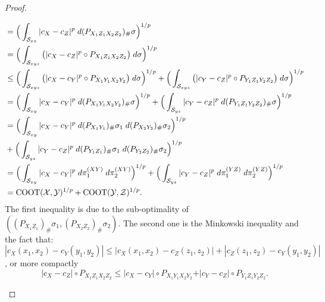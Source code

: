 \begin{proof}
\begin{enumerate}
\begin{equation}
\begin{split}
          &= \Big( \int_{\mathcal S_{xz}} \vert c_X - c_Z \vert^p
          \; d(P_{X_1 Z_1 X_2 Z_2})_{\#} \sigma \Big)^{1/p} \\
          &= \Big( \int_{\mathcal S_{xyz}} \big( \vert c_X - c_Z \vert^p \circ P_{X_1 Z_1 X_2 Z_2} \big)
          \; d \sigma \Big)^{1/p} \\
          &\leq \Big( \int_{\mathcal S_{xyz}} \big( \vert c_X - c_Y \vert^p \circ P_{X_1 Y_1 X_2 Y_2} \big)
          \; d \sigma \Big)^{1/p} +
          \Big( \int_{\mathcal S_{xyz}} \big( \vert c_Y - c_Z \vert^p \circ P_{Y_1 Z_1 Y_2 Z_2} \big)
          \; d \sigma \Big)^{1/p} \\
          &= \Big( \int_{\mathcal S_{xy}} \vert c_X - c_Y \vert^p
          \; d (P_{X_1 Y_1 X_2 Y_2})_{\#} \sigma \Big)^{1/p}  +
          \Big( \int_{\mathcal S_{yz}} \vert c_Y - c_Z \vert^p
          \; d (P_{Y_1 Z_1 Y_2 Z_2})_{\#} \sigma \Big)^{1/p}  \\
          &= \Big( \int_{\mathcal S_{xy}} \vert c_X - c_Y \vert^p
          \; d (P_{X_1 Y_1})_{\#} \sigma_1 \; d (P_{X_2 Y_2})_{\#} \sigma_2 \Big)^{1/p} \\
          &+ \Big( \int_{\mathcal S_{yz}} \vert c_Y - c_Z \vert^p
          \; d (P_{Y_1 Z_1})_{\#} \sigma_1 \; d (P_{Y_2 Z_2})_{\#} \sigma_2 \Big)^{1/p} \\
          &= \Big( \int_{\mathcal S_{xy}} \vert c_X - c_Y \vert^p \; d \pi^{(XY)}_1 \; d \pi^{(XY)}_2 \Big)^{1/p}  +
          \Big( \int_{\mathcal S_{yz}} \vert c_Y - c_Z \vert^p \; d \pi^{(YZ)}_1 \; d \pi^{(YZ)}_2 \Big)^{1/p} \\
          &= \text{COOT}(\mathcal X, \mathcal Y)^{1/p} + \text{COOT}(\mathcal Y, \mathcal Z)^{1/p}.
        \end{split}
      \end{equation}
      The first inequality is due to the sub-optimality of
      $((P_{X_1 Z_1})_{\#} \sigma_1, (P_{X_2 Z_2})_{\#} \sigma_2)$. The second one is
      the Minkowski inequality and the fact that:
      $|c_X(x_1,x_2) - c_Y(y_1,y_2)| \leq |c_X(x_1,x_2) - c_Z(z_1,z_2)| + |c_Z(z_1,z_2) - c_Y(y_1,y_2)|$,
      or more compactly
      \begin{equation}
        \vert c_X - c_Z \vert \circ P_{X_1 Z_1 X_2 Z_2} \leq
        \vert c_X - c_Y \vert \circ P_{X_1 Y_1 X_2 Y_2} +
        \vert c_Y - c_Z \vert \circ P_{Y_1 Z_1 Y_2 Z_2}.
      \end{equation}
    \end{enumerate}
\end{proof}

